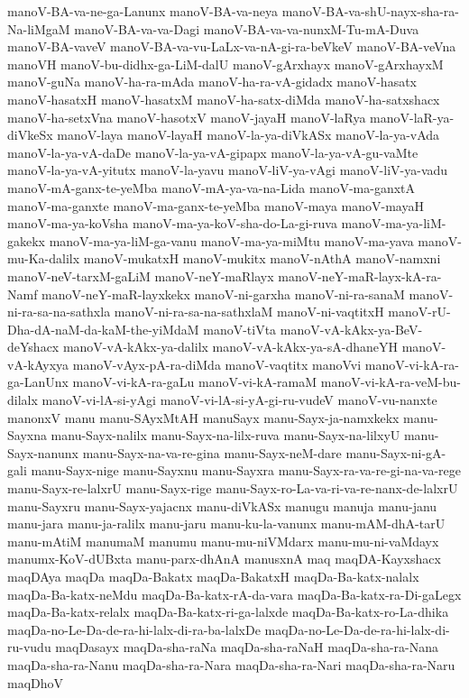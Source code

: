 {manoV-BA-va-ne-ga-Lanunx
manoV-BA-va-neya
manoV-BA-va-shU-nayx-sha-ra-Na-liMgaM
manoV-BA-va-va-Dagi
manoV-BA-va-va-nunxM-Tu-mA-Duva
manoV-BA-vaveV
manoV-BA-va-vu-LaLx-va-nA-gi-ra-beVkeV
manoV-BA-veVna
manoVH
manoV-bu-didhx-ga-LiM-dalU
manoV-gArxhayx
manoV-gArxhayxM
manoV-guNa
manoV-ha-ra-mAda
manoV-ha-ra-vA-gidadx
manoV-hasatx
manoV-hasatxH
manoV-hasatxM
manoV-ha-satx-diMda
manoV-ha-satxshacx
manoV-ha-setxVna
manoV-hasotxV
manoV-jayaH
manoV-laRya
manoV-laR-ya-diVkeSx
manoV-laya
manoV-layaH
manoV-la-ya-diVkASx
manoV-la-ya-vAda
manoV-la-ya-vA-daDe
manoV-la-ya-vA-gipapx
manoV-la-ya-vA-gu-vaMte
manoV-la-ya-vA-yitutx
manoV-la-yavu
manoV-liV-ya-vAgi
manoV-liV-ya-vadu
manoV-mA-ganx-te-yeMba
manoV-mA-ya-va-na-Lida
manoV-ma-ganxtA
manoV-ma-ganxte
manoV-ma-ganx-te-yeMba
manoV-maya
manoV-mayaH
manoV-ma-ya-koVsha
manoV-ma-ya-koV-sha-do-La-gi-ruva
manoV-ma-ya-liM-gakekx
manoV-ma-ya-liM-ga-vanu
manoV-ma-ya-miMtu
manoV-ma-yava
manoV-mu-Ka-dalilx
manoV-mukatxH
manoV-mukitx
manoV-nAthA
manoV-namxni
manoV-neV-tarxM-gaLiM
manoV-neY-maRlayx
manoV-neY-maR-layx-kA-ra-Namf
manoV-neY-maR-layxkekx
manoV-ni-garxha
manoV-ni-ra-sanaM
manoV-ni-ra-sa-na-sathxla
manoV-ni-ra-sa-na-sathxlaM
manoV-ni-vaqtitxH
manoV-rU-Dha-dA-naM-da-kaM-the-yiMdaM
manoV-tiVta
manoV-vA-kAkx-ya-BeV-deYshacx
manoV-vA-kAkx-ya-dalilx
manoV-vA-kAkx-ya-sA-dhaneYH
manoV-vA-kAyxya
manoV-vAyx-pA-ra-diMda
manoV-vaqtitx
manoVvi
manoV-vi-kA-ra-ga-LanUnx
manoV-vi-kA-ra-gaLu
manoV-vi-kA-ramaM
manoV-vi-kA-ra-veM-bu-dilalx
manoV-vi-lA-si-yAgi
manoV-vi-lA-si-yA-gi-ru-vudeV
manoV-vu-nanxte
manonxV
manu
manu-SAyxMtAH
manuSayx
manu-Sayx-ja-namxkekx
manu-Sayxna
manu-Sayx-nalilx
manu-Sayx-na-lilx-ruva
manu-Sayx-na-lilxyU
manu-Sayx-nanunx
manu-Sayx-na-va-re-gina
manu-Sayx-neM-dare
manu-Sayx-ni-gA-gali
manu-Sayx-nige
manu-Sayxnu
manu-Sayxra
manu-Sayx-ra-va-re-gi-na-va-rege
manu-Sayx-re-lalxrU
manu-Sayx-rige
manu-Sayx-ro-La-va-ri-va-re-nanx-de-lalxrU
manu-Sayxru
manu-Sayx-yajacnx
manu-diVkASx
manugu
manuja
manu-janu
manu-jara
manu-ja-ralilx
manu-jaru
manu-ku-la-vanunx
manu-mAM-dhA-tarU
manu-mAtiM
manumaM
manumu
manu-mu-niVMdarx
manu-mu-ni-vaMdayx
manumx-KoV-dUBxta
manu-parx-dhAnA
manusxnA
maq
maqDA-Kayxshacx
maqDAya
maqDa
maqDa-Bakatx
maqDa-BakatxH
maqDa-Ba-katx-nalalx
maqDa-Ba-katx-neMdu
maqDa-Ba-katx-rA-da-vara
maqDa-Ba-katx-ra-Di-gaLegx
maqDa-Ba-katx-relalx
maqDa-Ba-katx-ri-ga-lalxde
maqDa-Ba-katx-ro-La-dhika
maqDa-no-Le-Da-de-ra-hi-lalx-di-ra-ba-lalxDe
maqDa-no-Le-Da-de-ra-hi-lalx-di-ru-vudu
maqDasayx
maqDa-sha-raNa
maqDa-sha-raNaH
maqDa-sha-ra-Nana
maqDa-sha-ra-Nanu
maqDa-sha-ra-Nara
maqDa-sha-ra-Nari
maqDa-sha-ra-Naru
maqDhoV
}
